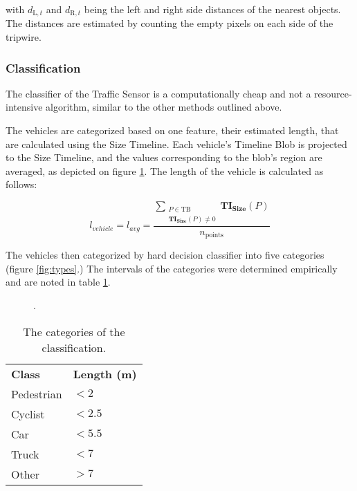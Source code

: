 with $d_{\text{L},t}$ and $d_{\text{R},t}$ being the left and right side distances of the nearest objects.
The distances are estimated by counting the empty pixels on each side of the tripwire.

\subsubsection{Classification}
The classifier of the Traffic Sensor is a computationally cheap and not a resource-intensive algorithm, similar to the other methods outlined above.

The vehicles are categorized based on one feature, their estimated length, that are calculated using the Size Timeline.
Each vehicle's Timeline Blob is projected to the Size Timeline, and the values corresponding to the blob's region are averaged, as depicted on figure \ref{fig:classification}. 
The length of the vehicle is calculated as follows:

\begin{displaymath}
	l_{vehicle} = l_{avg} = \frac{\sum\limits_{\substack{P \in \text{TB} \\ \boldsymbol{TI_{\text{Size}}}(P)\neq 0}} \boldsymbol{TI_{\text{Size}}}(P)}{n_{\text{points}}}
\end{displaymath}

The vehicles then categorized by hard decision classifier into five categories (figure \ref{fig:types}.) 
The intervals of the categories were determined empirically and are noted in table \ref{tab:intervals}.

\begin{figure}[!h]
	\centering
	
	\caption{.\label{fig:classification}}
\end{figure}

\begin{table}[!h]
	\centering
	\caption{The categories of the classification.}
	\label{tab:intervals}
	\begin{tabular}{ll}
		\textbf{Class} & \textbf{Length (m)} \\
		Pedestrian     & $< 2$               \\
		Cyclist        & $< 2.5$             \\
		Car            & $< 5.5$             \\
		Truck          & $< 7$               \\
		Other          & $> 7$              
	\end{tabular}
\end{table}


